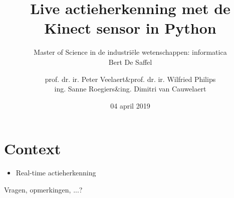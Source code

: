 \documentclass[]{beamer}
\begin{document}
	\title[Actieherkenning met de Kinect sensor]{Live actieherkenning met de Kinect sensor in Python}
	\author[Bert De Saffel]{
				\begin{tabular}{rcr}
				prof. dr. ir. Peter Veelaert &\&& prof. dr. ir. Wilfried Philips \\
				ing. Sanne Roegiers &\&& ing. Dimitri van Cauwelaert
				\end{tabular}
	}
	
	\subtitle{Master of Science in de industriële wetenschappen: informatica \\ \vspace{0.2cm} Bert De Saffel}
	\date{04 april 2019}
	\frame{\titlepage}
	
	\section{Context}
	\begin{frame}
		\begin{itemize}
			\item Real-time actieherkenning
		\end{itemize}
	\end{frame}


	\begin{frame}
		\begin{center}
			\Huge Vragen, opmerkingen, ...?
		\end{center}
	\end{frame}
\end{document}

